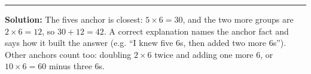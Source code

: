 \documentclass[12pt]{article}
\begin{document}
\noindent\rule{\linewidth}{0.2pt}


\textbf{Solution:} The fives anchor is closest: $5 \times 6 = 30$, and the two more groups are $2 \times 6 = 12$, so $30 + 12 = 42$. A correct explanation names the anchor fact and says how it built the answer (e.g. ``I knew five 6s, then added two more 6s''). Other anchors count too: doubling $2 \times 6$ twice and adding one more 6, or $10 \times 6 = 60$ minus three 6s. 
\end{document}
